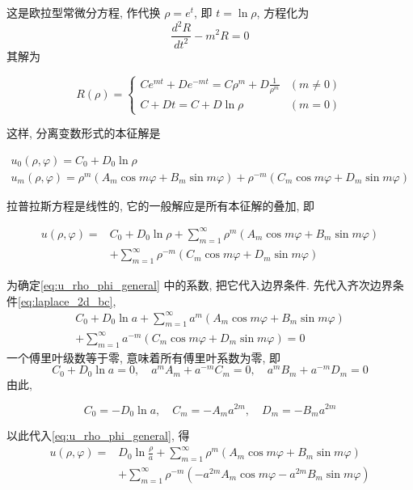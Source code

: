 这是欧拉型常微分方程, 作代换 $\rho=e^{t}$, 即 $t=\ln \rho$, 方程化为
$$
\frac{d^{2} R}{d t^{2}}-m^{2} R=0
$$
其解为

$$
R(\rho)= \begin{cases}C e^{m t}+D e^{-m t}=C \rho^{m}+D \frac{1}{\rho^{m}} & (m \neq 0) \\ C+D t=C+D \ln \rho & (m=0)\end{cases}
$$

这样, 分离变数形式的本征解是

$$
\begin{gathered}
u_{0}(\rho, \varphi)=C_{0}+D_{0} \ln \rho \\
u_{m}(\rho, \varphi)=\rho^{m}\left(A_{m} \cos m \varphi+B_{m} \sin m \varphi\right)+\rho^{-m}\left(C_{m} \cos m \varphi+D_{m} \sin m \varphi\right)
\end{gathered}
$$

拉普拉斯方程是线性的, 它的一般解应是所有本征解的叠加, 即

\begin{equation}
\begin{aligned}
u(\rho, \varphi)= & C_{0}+D_{0} \ln \rho+\sum_{m=1}^{\infty} \rho^{m}\left(A_{m} \cos m \varphi+B_{m} \sin m \varphi\right) \\
& +\sum_{m=1}^{\infty} \rho^{-m}\left(C_{m} \cos m \varphi+D_{m} \sin m \varphi\right)
\end{aligned}
\label{eq:u_rho_phi_general}
\end{equation}

为确定\eqref{eq:u_rho_phi_general} 中的系数, 把它代入边界条件. 先代入齐次边界条件\eqref{eq:laplace_2d_bc},
$$
\begin{gathered}
C_{0}+D_{0} \ln a+\sum_{m=1}^{\infty} a^{m}\left(A_{m} \cos m \varphi+B_{m} \sin m \varphi\right) \\
+\sum_{m=1}^{\infty} a^{-m}\left(C_{m} \cos m \varphi+D_{m} \sin m \varphi\right)=0
\end{gathered}
$$
一个傅里叶级数等于零, 意味着所有傅里叶系数为零, 即
$$
C_{0}+D_{0} \ln a=0, \quad a^{m} A_{m}+a^{-m} C_{m}=0, \quad a^{m} B_{m}+a^{-m} D_{m}=0
$$
由此,

$$
C_{0}=-D_{0} \ln a, \quad C_{m}=-A_{m} a^{2 m}, \quad D_{m}=-B_{m} a^{2 m}
$$

以此代入\eqref{eq:u_rho_phi_general}, 得
\begin{equation}
    \begin{aligned}
        u(\rho, \varphi)= & D_{0} \ln \frac{\rho}{a}+\sum_{m=1}^{\infty} \rho^{m}\left(A_{m} \cos m \varphi+B_{m} \sin m \varphi\right) \\
        & +\sum_{m=1}^{\infty} \rho^{-m}\left(-a^{2 m} A_{m} \cos m \varphi-a^{2 m} B_{m} \sin m \varphi\right)
        \end{aligned}
        \label{eq:u_rho_phi_2}
\end{equation}


